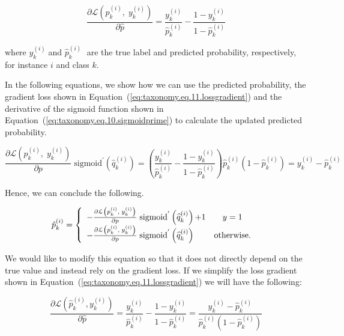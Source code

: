 \begin{equation}
    \label{eq:taxonomy.eq.11.lossgradient}
    \frac{\partial \mathcal{L} \left( \widehat{p}_k^{(i)},\;y_k^{(i)}\right)}{\partial \widehat{p}}=\frac{y_k^{(i)}}{\widehat{p}_k^{(i)}}-\frac{1-y_k^{(i)}}{1-\widehat{p}_k^{(i)}}
\end{equation}


where $y_k^{(i)}\; $and ${\widehat p}_k^{(i)}\; $ are the true label and predicted probability, respectively, for instance $i $ and class $k $.

In the following equations, we show how we can use the predicted probability, the gradient loss shown in Equation~(\ref{eq:taxonomy.eq.11.lossgradient}) and the derivative of the sigmoid function shown in Equation~(\ref{eq:taxonomy.eq.10.sigmoidprime}) to calculate the updated predicted probability.


\begin{equation}
\label{eq:taxonomy.eq.12.newpredelement}
\frac{\partial \mathcal{L}\left(p_k^{(i)},\; y_k^{(i)}\right)}{\partial p}\;\text{sigmoid}^{'}\left(\widehat{q}_k^{(i)}\right)=\left(\frac{y_k^{(i)}}{\widehat{p}_k^{(i)}}-\frac{1-y_k^{(i)}}{1-\widehat{p}_k^{(i)}}\right)\widehat{p}_k^{(i)}\left(1-\widehat{p}_k^{(i)}\right)=y_k^{(i)}-\widehat{p}_k^{(i)}
\end{equation}

Hence, we can conclude the following.

\begin{equation}
    \label{eq:taxonomy.eq.13.newpred}
    \begin{array}{@{}l}\hat{p}_{k}^{(i)} = \left\{\begin{array}{lc}-\frac{\partial \mathcal{L}\left(p_k^{(i)},\;y_k^{(i)}\right)}{\partial p}\;\text{sigmoid}^{'}\left(\widehat{q}_k^{(i)}\right)\text{+1}&y=1\\-\frac{\partial \mathcal{L}\left(p_k^{(i)},\;y_k^{(i)}\right)}{\partial p}\;\text{sigmoid}^{'}\left(\widehat{q}_k^{(i)}\right) & \text{otherwise.} \end{array}\right.\end{array}
\end{equation}

We would like to modify this equation so that it does not directly depend on the true value and instead rely on the gradient loss. If we simplify the loss gradient shown in Equation~(\ref{eq:taxonomy.eq.11.lossgradient})  we will have the following:

\begin{equation}
    \label{eq:taxonomy.eq.14.newlossgradient}
    \frac{\partial \mathcal{L}(\widehat{p}_k^{(i)}, y_k^{(i)})}{\partial \widehat{p}} = \frac{y_k^{(i)}}{\widehat{p}_k^{(i)}} - \frac{1 - y_k^{(i)}}{1 - \widehat{p}_k^{(i)}} = \frac{y_k^{(i)} - \widehat{p}_k^{(i)}}{\widehat{p}_k^{(i)}(1 - \widehat{p}_k^{(i)})}
\end{equation}


